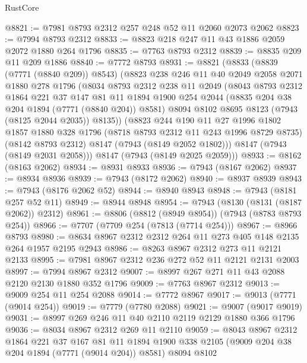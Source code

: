 \begin{lexlean}{RustCore}
\begin{coremodule}
@8821 := @7981 @8793 @2312 @257 @248 @52 @11 @2060 @2073 @2062
@8823 := @7994 @8793 @2312
@8833 := @8823 @218 @247 @11 @43 @1886 @2059 @2072 @1880 @264 @1796
@8835 := @7763 @8793 @2312
@8839 := @8835 @209 @11 @209 @1886
@8840 := @7772 @8793
@8931 := @8821
    (@8833
      (@8839 (@7771 (@8840 @209)) @8543)
      (@8823
        @238
        @246
        @11
        @40
        @2049
        @2058
        @2071
        @1880
        @278
        @1796
        (@8034
          @8793
          @2312
          @238
          @11
          @2049
          (@8043
            @8793
            @2312
            @1864
            @221
            @37
            @147
            @81
            @11
            @1894
            @1900
            @254
            @2044
            (@8835 @204 @38 @204 @1894 (@7771 (@8840 @204)) @8581)
            @8094
            @8102
            @8695
            @8123
            (@7943 (@8125 @2044 @2035))
            @8135))
        (@8823
          @244
          @190
          @11
          @27
          @1996
          @1802
          @1857
          @1880
          @328
          @1796
          (@8718 @8793 @2312 @11 @243 @1996 @8729 @8735)
          (@8142 @8793 @2312)
          @8147
          (@7943 (@8149 @2052 @1802)))
        @8147
        (@7943 (@8149 @2031 @2058)))
      @8147
      (@7943 (@8149 @2025 @2059)))
@8933 := @8162 (@8163 @2062)
@8934 := @8931 @8933
@8936 := @7943 (@8167 @2062)
@8937 := @8934 @8936
@8939 := @7943 (@8172 @2062)
@8940 := @8937 @8939
@8943 := @7943 (@8176 @2062 @52)
@8944 := @8940 @8943
@8948 := @7943 (@8181 @257 @52 @11)
@8949 := @8944 @8948
@8954 := @7943 (@8130 (@8131 (@8187 @2062)) @2312)
@8961 := @8806 (@8812 (@8949 @8954)) (@7943 (@8783 @8793 @254))
@8966 := @7707 (@7709 @254 (@7813 (@7714 @254)))
@8967 := @8966 @8793
@8980 := @8634 @8967 @2312 @2312 @264 @11 @273 @405 @148 @2135 @264 @1957 @2195 @2943
@8986 := @8263 @8967 @2312 @273 @11 @2121 @2133
@8995 := @7981 @8967 @2312 @236 @272 @52 @11 @2121 @2131 @2003
@8997 := @7994 @8967 @2312
@9007 := @8997 @267 @271 @11 @43 @2088 @2120 @2130 @1880 @352 @1796
@9009 := @7763 @8967 @2312
@9013 := @9009 @254 @11 @254 @2088
@9014 := @7772 @8967
@9017 := @9013 (@7771 (@9014 @254))
@9019 := @7779 (@7780 @2088)
@9021 := @9007 (@9017 @9019)
@9031 := @8997 @269 @246 @11 @40 @2110 @2119 @2129 @1880 @366 @1796
@9036 := @8034 @8967 @2312 @269 @11 @2110
@9059 := @8043
    @8967
    @2312
    @1864
    @221
    @37
    @167
    @81
    @11
    @1894
    @1900
    @338
    @2105
    (@9009 @204 @38 @204 @1894 (@7771 (@9014 @204)) @8581)
    @8094
    @8102

\end{coremodule}
\end{lexlean}
